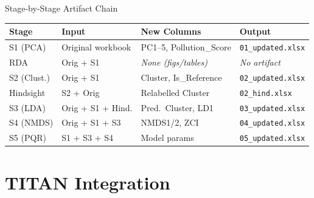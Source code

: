 \documentclass[aspectratio=169, 11pt]{beamer}
\newcommand{\code}[1]{\texttt{\small #1}}
\begin{document}
\begin{frame}{Stage-by-Stage Artifact Chain}
  \begin{center}\small
  \renewcommand{\arraystretch}{1.15}
  \begin{tabular}{l p{3.2cm} p{4.5cm} p{3.5cm}}
    \toprule
    Stage & Input & New Columns & Output \\
    \midrule
    S1 (PCA)    & Original workbook  & PC1--5, Pollution\_Score  & \code{01\_updated.xlsx} \\
    RDA         & Orig + S1          & \emph{None (figs/tables)} & \emph{No artifact} \\
    S2 (Clust.) & Orig + S1          & Cluster, Is\_Reference    & \code{02\_updated.xlsx} \\
    Hindsight   & S2 + Orig          & Relabelled Cluster        & \code{02\_hind.xlsx} \\
    S3 (LDA)    & Orig + S1 + Hind.  & Pred.\ Cluster, LD1      & \code{03\_updated.xlsx} \\
    S4 (NMDS)   & Orig + S1 + S3     & NMDS1/2, ZCI             & \code{04\_updated.xlsx} \\
    S5 (PQR)    & S1 + S3 + S4       & Model params             & \code{05\_updated.xlsx} \\
    \bottomrule
  \end{tabular}
  \end{center}
\end{frame}


\section{TITAN Integration}
\end{document}
